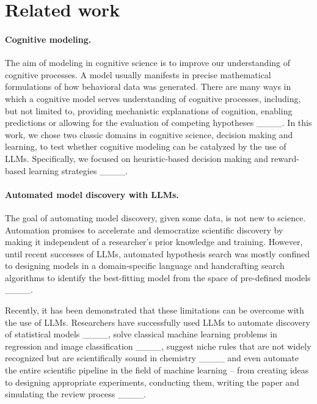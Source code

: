 \section{Related work}
\paragraph{Cognitive modeling.}
The aim of modeling in cognitive science is to improve our understanding of cognitive processes. A model usually manifests in precise mathematical formulations of how behavioral data was generated. There are many ways in which a cognitive model serves understanding of cognitive processes, including, but not limited to, providing mechanistic explanations of cognition, enabling predictions or allowing for the evaluation of competing hypotheses  ____. In this work, we chose two classic domains in cognitive science, decision making and learning, to test whether cognitive modeling can be catalyzed by the use of LLMs. Specifically, we focused on heuristic-based decision making and reward-based learning strategies ____.

\paragraph{Automated model discovery with LLMs.}
The goal of automating model discovery, given some data, is not new to science. Automation promises to accelerate and democratize scientific discovery by making it independent of a researcher's prior knowledge and training. However, until recent successes of LLMs, automated hypothesis search was mostly confined to designing models in a domain-specific language and handcrafting search algorithms to identify the best-fitting model from the space of pre-defined models ____. 

Recently, it has been demonstrated that these limitations can be overcome with the use of LLMs. Researchers have successfully used LLMs to automate discovery of statistical models ____, solve classical machine learning problems in regression and image classification ____, suggest niche rules that are not widely recognized but are scientifically sound in chemistry ____ and even automate the entire scientific pipeline in the field of machine learning -- from creating ideas to designing appropriate experiments, conducting them, writing the paper and simulating the review process ____.

